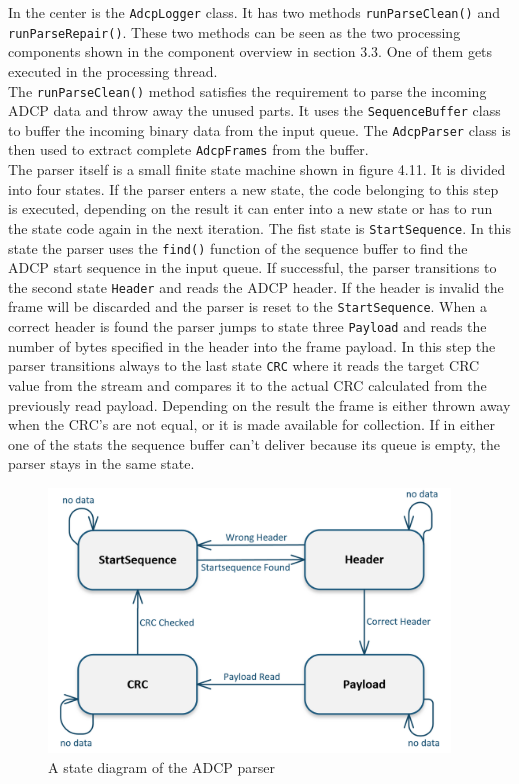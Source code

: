 In the center is the \texttt{AdcpLogger} class. It has two methods \texttt{runParseClean()} and \texttt{runParseRepair()}. These two methods can be seen as the two processing components shown in the component overview in section 3.3. One of them gets executed in the processing thread.\\
The \texttt{runParseClean()} method satisfies the requirement to parse the incoming ADCP data and throw away the unused parts. It uses the \texttt{SequenceBuffer} class to buffer the incoming binary data from the input queue. The \texttt{AdcpParser} class is then used to extract complete \texttt{AdcpFrames} from the buffer.\\
The parser itself is a small finite state machine shown in figure 4.11. It is divided into four states. If the parser enters a new state, the code belonging to this step is executed, depending on the result it can enter into a new state or has to run the state code again in the next iteration. The fist state is \texttt{StartSequence}. In this state the parser uses the \texttt{find()} function of the sequence buffer to find the ADCP start sequence in the input queue. If successful, the parser transitions to the second state \texttt{Header} and reads the ADCP header. If the header is invalid the frame will be discarded and the parser is reset to the \texttt{StartSequence}. When a correct header is found the parser jumps to state three \texttt{Payload} and reads the number of bytes specified in the header into the frame payload. In this step the parser transitions always to the last state \texttt{CRC} where it reads the target CRC value from the stream and compares it to the actual CRC calculated from the previously read payload. Depending on the result the frame is either thrown away when the CRC's are not equal, or it is made available for collection. If in either one of the stats the sequence buffer can't deliver because its queue is empty, the parser stays in the same state.

\begin{figure}[h]
\centering
      \includegraphics[width=0.95\textwidth]{parser}
        \caption{A state diagram of the ADCP parser}
\end{figure}

